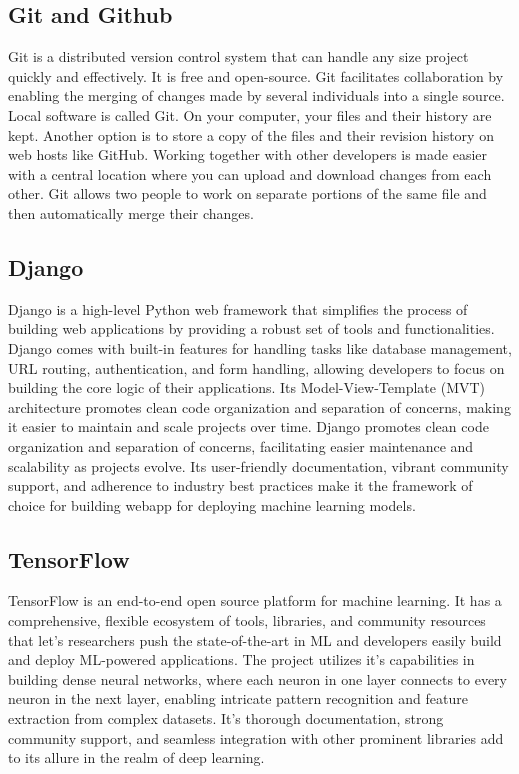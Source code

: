 \subsection*{Git and Github}
Git is a distributed version control system that can handle any size project quickly and effectively. It is free and open-source. Git facilitates collaboration by enabling the merging of changes made by several individuals into a single source. Local software is called Git. On your computer, your files and their history are kept. Another option is to store a copy of the files and their revision history on web hosts like GitHub. Working together with other developers is made easier with a central location where you can upload and download changes from each other. Git allows two people to work on separate portions of the same file and then automatically merge their changes.

\subsection*{Django}
Django is a high-level Python web framework that simplifies the process of building web applications by providing a robust set of tools and functionalities. Django comes with built-in features for handling tasks like database management, URL routing, authentication, and form handling, allowing developers to focus on building the core logic of their applications. Its Model-View-Template (MVT) architecture promotes clean code organization and separation of concerns, making it easier to maintain and scale projects over time. Django promotes clean code organization and separation of concerns, facilitating easier maintenance and scalability as projects evolve. Its user-friendly documentation, vibrant community support, and adherence to industry best practices make it the framework of choice for building webapp for deploying machine learning models.

\subsection*{TensorFlow}
TensorFlow is an end-to-end open source platform for machine learning. It has a comprehensive, flexible ecosystem of tools, libraries, and community resources that let's researchers push the state-of-the-art in ML and developers easily build and deploy ML-powered applications. The project utilizes it's capabilities in building dense neural networks, where each neuron in one layer connects to every neuron in the next layer, enabling intricate pattern recognition and feature extraction from complex datasets. It's thorough documentation, strong community support, and seamless integration with other prominent libraries add to its allure in the realm of deep learning.
\newpage
